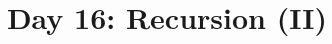 \documentclass{article}
\begin{document}
\title{Day 16: Recursion (II)}
\author{}
\date{}

\maketitle


\end{document}
